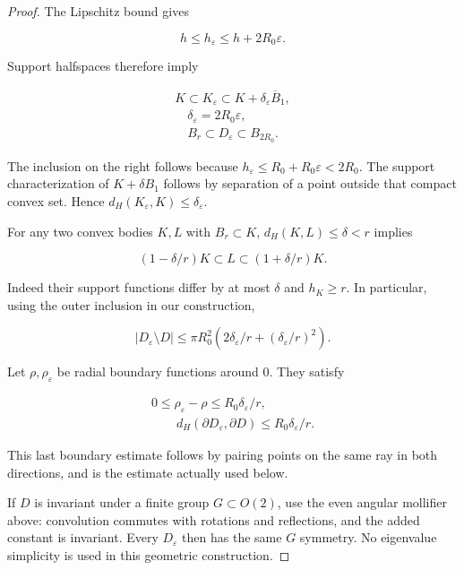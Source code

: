 \documentclass[11pt]{article}
\theoremstyle{definition}
\theoremstyle{remark}
\numberwithin{equation}{section}
\begin{document}
\begin{proof}
The Lipschitz bound gives

\begin{equation}\label{eq:src-1-04}
h\le h_\varepsilon\le h+2R_0\varepsilon.
\end{equation} 

Support halfspaces therefore imply

\begin{equation}\label{eq:src-1-05}
\begin{gathered}
K\subset K_\varepsilon\subset K+\delta_\varepsilon\overline B_1, \\
\quad\delta_\varepsilon=2R_0\varepsilon, \\
\quad B_r\subset D_\varepsilon\subset B_{2R_0}.
\end{gathered}
\end{equation}

The inclusion on the right follows because $h_\varepsilon\le R_0+R_0\varepsilon<2R_0$. The support characterization of $K+\delta B_1$ follows by separation of a point outside that compact convex set. Hence $d_H(K_\varepsilon,K)\le\delta_\varepsilon$.

For any two convex bodies $K,L$ with $B_r\subset K$, $d_H(K,L)\le\delta<r$ implies

\begin{equation}\label{eq:src-1-06}
(1-\delta/r)K\subset L\subset(1+\delta/r)K.
\end{equation}

Indeed their support functions differ by at most $\delta$ and $h_K\ge r$. In particular, using the outer inclusion in our construction,

\begin{equation}\label{eq:src-1-07}
|D_\varepsilon\setminus D|\le\pi R_0^2(2\delta_\varepsilon/r+(\delta_\varepsilon/r)^2).
\end{equation}

Let $\rho,\rho_\varepsilon$ be radial boundary functions around 0. They satisfy

\begin{equation}\label{eq:src-1-08}
\begin{gathered}
0\le\rho_\varepsilon-\rho\le R_0\delta_\varepsilon/r, \\
\qquad d_H(\partial D_\varepsilon,\partial D)\le R_0\delta_\varepsilon/r.
\end{gathered}
\end{equation}

This last boundary estimate follows by pairing points on the same ray in both directions, and is the estimate actually used below.

If $D$ is invariant under a finite group $G\subset O(2)$, use the even angular mollifier above: convolution commutes with rotations and reflections, and the added constant is invariant. Every $D_\varepsilon$ then has the same $G$ symmetry. No eigenvalue simplicity is used in this geometric construction.
\end{proof}
\end{document}
